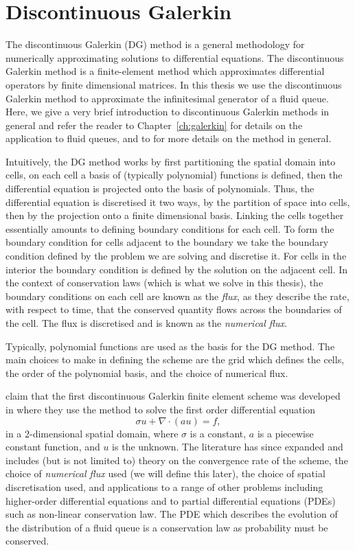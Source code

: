 \section{Discontinuous Galerkin}
The discontinuous Galerkin (DG) method is a general methodology for numerically approximating solutions to differential equations. The discontinuous Galerkin method is a finite-element method which approximates differential operators by finite dimensional matrices. In this thesis we use the discontinuous Galerkin method to approximate the infinitesimal generator of a fluid queue. Here, we give a very brief introduction to discontinuous Galerkin methods in general and refer the reader to Chapter~\ref{ch:galerkin} for details on the application to fluid queues, and to \cite{nodalDGBook} for more details on the method in general. 

Intuitively, the DG method works by first partitioning the spatial domain into cells, on each cell a basis of (typically polynomial) functions is defined, then the differential equation is projected onto the basis of polynomials. Thus, the differential equation is discretised it two ways, by the partition of space into cells, then by the projection onto a finite dimensional basis. Linking the cells together essentially amounts to defining boundary conditions for each cell. To form the boundary condition for cells adjacent to the boundary we take the boundary condition defined by the problem we are solving and discretise it. For cells in the interior the boundary condition is defined by the solution on the adjacent cell. In the context of conservation laws (which is what we solve in this thesis), the boundary conditions on each cell are known as the \emph{flux}, as they describe the rate, with respect to time, that the conserved quantity flows across the boundaries of the cell. The flux is discretised and is known as the \emph{numerical flux}.

Typically, polynomial functions are used as the basis for the DG method. The main choices to make in defining the scheme are the grid which defines the cells, the order of the polynomial basis, and the choice of numerical flux. 

\cite{nodalDGBook} claim that the first discontinuous Galerkin finite element scheme was developed in \cite{reed1973} where they use the method to solve the first order differential equation
\[\sigma u + \nabla \cdot (a u) = f,\]
in a 2-dimensional spatial domain, where \(\sigma\) is a constant, \(a\) is a piecewise constant function, and \(u\) is the unknown. The literature has since expanded and includes (but is not limited to) theory on the convergence rate of the scheme, the choice of \emph{numerical flux} used (we will define this later), the choice of spatial discretisation used, and applications to a range of other problems including higher-order differential equations and to partial differential equations (PDEs) such as non-linear conservation law. The PDE which describes the evolution of the distribution of a fluid queue is a conservation law as probability must be conserved. 

